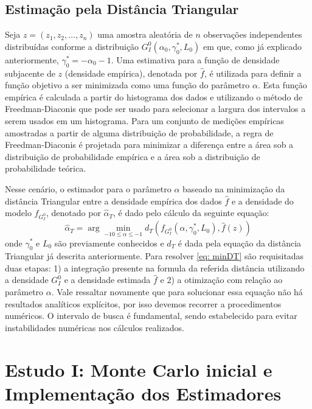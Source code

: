 \documentclass[12pt]{article}
\begin{document}
\subsection{Estimação pela Distância Triangular}

Seja $z = (z_1, z_2, \dots, z_n)$ uma amostra aleatória de $n$ observações independentes distribuídas conforme a distribuição $G_I^0(\alpha_0, \gamma_0^{*}, L_0)$ em que, como já explicado anteriormente, $\gamma_0^{*} = - \alpha_0 - 1$. Uma estimativa para a função de densidade subjacente de $z$ (densidade empírica), denotada por $\hat{f}$, é utilizada para definir a função objetivo a ser minimizada como uma função do parâmetro $\alpha$. Esta função empírica é calculada a partir do histograma dos dados e utilizando o método de Freedman-Diaconis que pode ser usado para selecionar a largura dos intervalos a serem usados em um histograma. Para um conjunto de medições empíricas amostradas a partir de alguma distribuição de probabilidade, a regra de Freedman-Diaconis é projetada para minimizar a diferença entre a área sob a distribuição de probabilidade empírica e a área sob a distribuição de probabilidade teórica. 

Nesse cenário, o estimador para o parâmetro $\alpha$ baseado na minimização da distância Triangular entre a densidade empírica dos dados $\hat{f}$ e a densidade do modelo $f_{G_I^0}$, denotado por $\hat{\alpha}_{T}$, é dado pelo cálculo da seguinte equação:
\begin{equation}
    \hat{\alpha}_{T} = \arg\min_{-10 \leq \alpha \leq -1} d_T(f_{G_I^0}(\alpha, \gamma_0^{*}, L_0), \hat{f}(z)) 
    \label{eq: minDT}
\end{equation}
onde $\gamma_0^{*}$ e $L_0$ são previamente conhecidos e $d_T$ é dada pela equação da distância Triangular já descrita anteriormente. Para resolver \eqref{eq: minDT} são requisitadas duas etapas: 1) a integração presente na formula da referida distância utilizando a densidade $G_I^0$ e a densidade estimada $\hat{f}$ e 2) a otimização com relação ao parâmetro $\alpha$. Vale ressaltar novamente que para solucionar essa equação não há resultados analíticos explícitos, por isso devemos recorrer a procedimentos numéricos. O intervalo de busca é fundamental, sendo estabelecido para evitar instabilidades numéricas nos cálculos realizados.


\section{Estudo I: Monte Carlo inicial e Implementação dos Estimadores}
\end{document}
